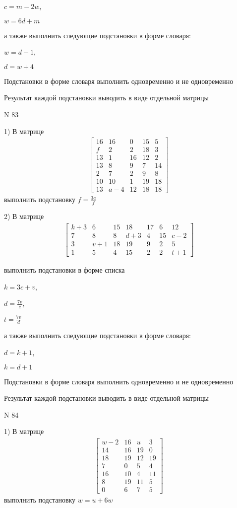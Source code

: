 \documentclass[11pt]{report}
\begin{document}
$c=m - 2 w$,

$w=6 d + m$

а также выполнить следующие подстановки в форме словаря:

$w=d - 1$,

$d=w + 4$


    Подстановки в форме словаря выполнить одновременно и не одновременно


    Результат каждой подстановки выводить в виде отдельной матрицы

\newpage
N 83


    1) В матрице
\begin{align*}
\left[\begin{matrix}16 & 16 & 0 & 15 & 5\\f & 2 & 2 & 18 & 3\\13 & 1 & 16 & 12 & 2\\13 & 8 & 9 & 7 & 14\\2 & 7 & 2 & 9 & 8\\10 & 10 & 1 & 19 & 18\\13 & a - 4 & 12 & 18 & 18\end{matrix}\right]
\end{align*}
выполнить подстановку $f=\frac{3 a}{f}$


    2) В матрице
\begin{align*}
\left[\begin{matrix}k + 3 & 6 & 15 & 18 & 17 & 6 & 12\\7 & 8 & 8 & d + 3 & 4 & 15 & c - 2\\3 & v + 1 & 18 & 19 & 9 & 2 & 5\\1 & 5 & 4 & 15 & 2 & 2 & t + 1\end{matrix}\right]
\end{align*}

выполнить подстановки в форме списка

$k=3 c + v$,

$d=\frac{7 v}{c}$,

$t=\frac{7 v}{d}$

а также выполнить следующие подстановки в форме словаря:

$d=k + 1$,

$k=d + 1$


    Подстановки в форме словаря выполнить одновременно и не одновременно


    Результат каждой подстановки выводить в виде отдельной матрицы

\newpage
N 84


    1) В матрице
\begin{align*}
\left[\begin{matrix}w - 2 & 16 & u & 3\\14 & 16 & 19 & 0\\18 & 19 & 12 & 19\\7 & 0 & 5 & 4\\16 & 10 & 4 & 11\\8 & 19 & 11 & 5\\0 & 6 & 7 & 5\end{matrix}\right]
\end{align*}
выполнить подстановку $w=u + 6 w$
\end{document}
